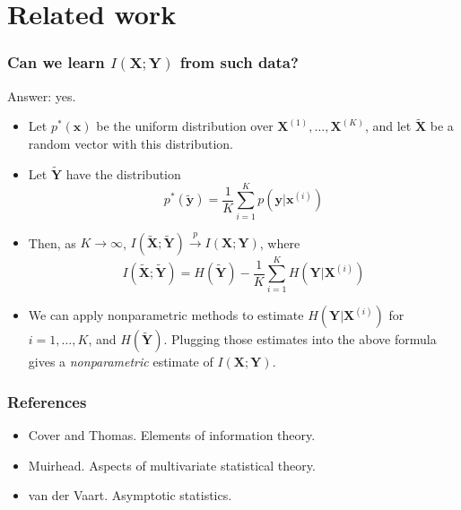 \documentclass{beamer}
\newcommand{\bx}{\boldsymbol{x}}
\newcommand{\by}{\boldsymbol{y}}
\newcommand{\bX}{\boldsymbol{X}}
\newcommand{\bY}{\boldsymbol{Y}}
\begin{document}
\section{Related work}

\begin{frame}
\frametitle{Can we learn $I(\bX; \bY)$ from such data?}
Answer: yes.
\begin{itemize}
\item Let $p^*(\bx)$ be the uniform distribution over $\bX^{(1)}, \hdots, \bX^{(K)}$, and let $\tilde{\bX}$ be a random vector with this distribution.
\item Let $\tilde{\bY}$ have the distribution
\[
p^*(\tilde{\by}) = \frac{1}{K} \sum_{i=1}^K p(\by|\bx^{(i)})
\] 
\item Then, as $K \to \infty$,  $I(\tilde{\bX}; \tilde{\bY})  \stackrel{p}{\to} I(\bX; \bY)$, where
\[
I(\tilde{\bX}; \tilde{\bY}) = H(\tilde{\bY}) - \frac{1}{K}\sum_{i=1}^K H(\bY| \bX^{(i)})
\]
\item We can apply nonparametric methods to estimate
  $H(\bY|\bX^{(i)})$ for $i = 1,\hdots, K$, and
  $H(\tilde{\bY})$. Plugging those estimates into the above formula
  gives a \emph{nonparametric} estimate of $I(\bX; \bY)$.
\end{itemize}
\end{frame}

\begin{frame}
\frametitle{References}
\begin{itemize}
\item Cover and Thomas.  Elements of information theory.
\item Muirhead.  Aspects of multivariate statistical theory.
\item van der Vaart.  Asymptotic statistics.
\end{itemize}
\end{frame}
\end{document}
